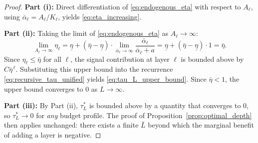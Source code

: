 \begin{proof}
\noindent\textbf{Part (i):} Direct differentiation of \eqref{eq:endogenous_eta} with respect to $A_\ell$, using $\bar{\alpha}_\ell = A_\ell / K_\ell$, yields \eqref{eq:eta_increasing}.

\noindent\textbf{Part (ii):} Taking the limit of \eqref{eq:endogenous_eta} as $A_\ell \to \infty$:
\begin{equation*}
\lim_{A_\ell \to \infty} \eta_\ell = \underline{\eta} + (\bar{\eta} - \underline{\eta}) \cdot \lim_{\bar{\alpha}_\ell \to \infty} \frac{\bar{\alpha}_\ell}{\bar{\alpha}_\ell + a} = \underline{\eta} + (\bar{\eta} - \underline{\eta}) \cdot 1 = \bar{\eta}.
\end{equation*}
Since $\eta_\ell \leq \bar{\eta}$ for all $\ell$, the signal contribution at layer $\ell$ is bounded above by $C\bar{\eta}^{\,\ell}$. Substituting this upper bound into the recurrence \eqref{eq:recursive_tau_unified} yields \eqref{eq:tau_L_upper_bound}. Since $\bar{\eta} < 1$, the upper bound converges to $0$ as $L \to \infty$.

\noindent\textbf{Part (iii):} By Part (ii), $\tau^{*}_L$ is bounded above by a quantity that converges to $0$, so $\tau^{*}_L \to 0$ for \emph{any} budget profile. The proof of Proposition~\ref{prop:optimal_depth} then applies unchanged: there exists a finite $\bar{L}$ beyond which the marginal benefit of adding a layer is negative.
\end{proof}

